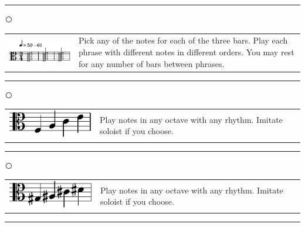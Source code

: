 \documentclass[12pt]{article}
\begin{document}
\vspace{0.3cm}

\hrule

\vspace{0.1cm}

\textcircled{}



\begin{tabular}{l l}
\begin{minipage}{0.5\textwidth}
\includegraphics[scale=1.5]{melodyalto.pdf}
\end{minipage}
&
\begin{minipage}{0.4\textwidth}
Pick any of the notes for each of the three bars. Play each phrase with different notes in different orders. You may rest for any number of bars between phrases.
\end{minipage}
\end{tabular}
\vspace{0.3cm}

\hrule

\vspace{0.1cm}

\textcircled{}

\begin{tabular}{l l}
\begin{minipage}{0.5\textwidth}
\includegraphics[scale=1.5]{facealto.pdf}
\end{minipage}
&
\begin{minipage}{0.4\textwidth}
Play notes in any octave with any rhythm. Imitate soloist if you choose. 
\end{minipage}
\end{tabular}

\vspace{0.3cm}

\hrule

\vspace{0.1cm}

\textcircled{}

\begin{tabular}{l l}
\begin{minipage}{0.5\textwidth}
\includegraphics[scale=1.5]{gacdalto.pdf}
\end{minipage}
&
\begin{minipage}{0.4\textwidth}
Play notes in any octave with any rhythm. Imitate soloist if you choose. 
\end{minipage}
\end{tabular}

\vspace{0.3cm}

\hrule
\end{document}
